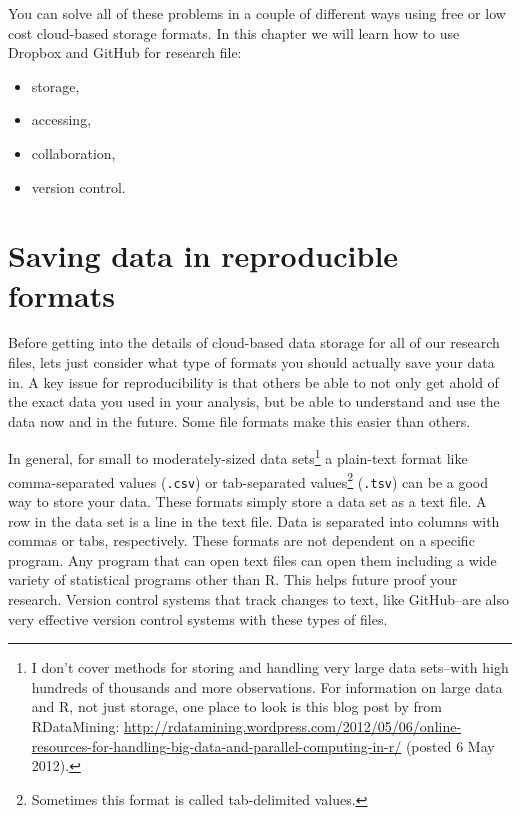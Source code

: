 You can solve all of these problems in a couple of different ways using free or low cost cloud-based storage formats. In this chapter we will learn how to use Dropbox and GitHub for research file:

\begin{itemize}
    \item storage,
    \item accessing,
    \item collaboration,
    \item version control.
\end{itemize}

\section{Saving data in reproducible formats}

Before getting into the details of cloud-based data storage for all of our research files, lets just consider what type of formats you should actually save your data in. A key issue for reproducibility is that others be able to not only get ahold of the exact data you used in your analysis, but be able to understand and use the data now and in the future. Some file formats make this easier than others.

In general, for small to moderately-sized data sets\footnote{I don't cover methods for storing and handling very large data sets--with high hundreds of thousands and more observations. For information on large data and R, not just storage, one place to look is this blog post by from RDataMining: \url{http://rdatamining.wordpress.com/2012/05/06/online-resources-for-handling-big-data-and-parallel-computing-in-r/} (posted 6 May 2012).} a plain-text format like comma-separated values (\texttt{.csv}) or tab-separated values\footnote{Sometimes this format is called tab-delimited values.} (\texttt{.tsv}) can be a good way to store your data. These formats simply store a data set as a text file. A row in the data set is a line in the text file. Data is separated into columns with commas or tabs, respectively. These formats are not dependent on a specific program. Any program that can open text files can open them including a wide variety of statistical programs other than R. This helps future proof your research. Version control systems that track changes to text, like GitHub--are also very effective version control systems with these types of files. 

